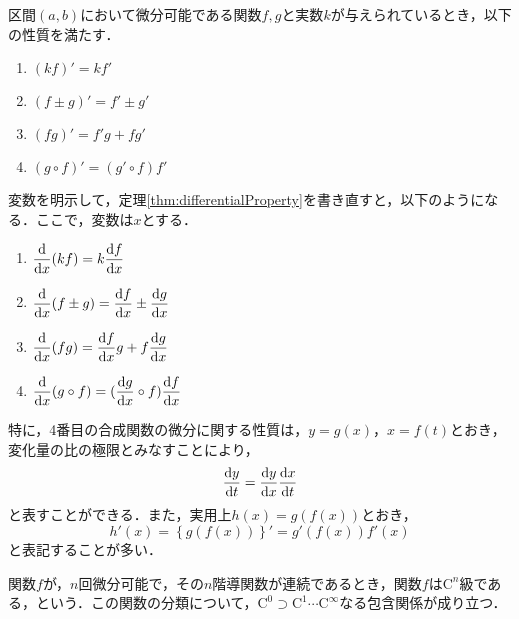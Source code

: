 \begin{theorem}[微分の性質]
	\label{thm:differentialProperty}%
	区間$(a,b)$において微分可能である関数$f, g$と実数$k$が与えられているとき，以下の性質を満たす．
	\begin{enumerate}
		\item $(kf)' = kf'$
		\item $(f \pm g)' = f' \pm g'$
		\item $(fg)' = f'g + fg'$
		\item $(g\circ f)' = (g'\circ f)f'$
	\end{enumerate}
\end{theorem}
\begin{rem*}
	変数を明示して，定理\ref{thm:differentialProperty}を書き直すと，以下のようになる．ここで，変数は$x$とする．
	\begin{enumerate}[itemsep=2ex, label*=\arabic*.]
		\item $\displaystyle \frac{\mathrm{d}}{\mathrm{d} x}(kf) = k\frac{\mathrm{d} f}{\mathrm{d} x}$
		\item $\displaystyle \frac{\mathrm{d}}{\mathrm{d} x}(f \pm g) = \frac{\mathrm{d} f}{\mathrm{d} x} \pm \frac{\mathrm{d} g}{\mathrm{d} x}$
		\item $\displaystyle \frac{\mathrm{d}}{\mathrm{d} x}(fg) = \frac{\mathrm{d} f}{\mathrm{d} x}g + f\frac{\mathrm{d} g}{\mathrm{d} x}$
		\item $\displaystyle \frac{\mathrm{d}}{\mathrm{d} x}(g\circ f) = (\frac{\mathrm{d} g}{\mathrm{d} x}\circ f)\frac{\mathrm{d} f}{\mathrm{d} x}$
	\end{enumerate}
	特に，4番目の合成関数の微分に関する性質は，$y = g(x)$，$x = f(t)$とおき，変化量の比の極限とみなすことにより，
	\[
		\frac{\mathrm{d} y}{\mathrm{d} t} = \frac{\mathrm{d} y}{\mathrm{d} x}\frac{\mathrm{d} x}{\mathrm{d} t}
	\]
	と表すことができる\footnotemark[2]．また，実用上$h(x) = g\left(f(x)\right)$とおき，
	\[
		h'(x) = \left\{g\left(f(x)\right)\right\}' = g'\left(f(x)\right)f'(x)
	\]
	と表記することが多い．
\end{rem*}

\begin{definition}[$\mathrm{C}^n$級]
	関数$f$が，$n$回微分可能で，その$n$階導関数が連続であるとき，関数$f$は$\mathrm{C}^n$級である，という．この関数の分類について，$\mathrm{C}^0 \supset \mathrm{C}^1 \cdots \mathrm{C}^\infty$なる包含関係が成り立つ．
\end{definition}

